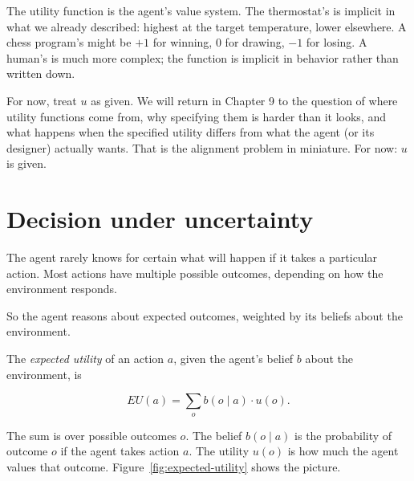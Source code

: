 The utility function is the agent's value system. The thermostat's is implicit in what we already described: highest at the target temperature, lower elsewhere. A chess program's might be $+1$ for winning, $0$ for drawing, $-1$ for losing. A human's is much more complex; the function is implicit in behavior rather than written down.

For now, treat $u$ as given. We will return in Chapter 9 to the question of where utility functions come from, why specifying them is harder than it looks, and what happens when the specified utility differs from what the agent (or its designer) actually wants. That is the alignment problem in miniature. For now: $u$ is given.

\section*{Decision under uncertainty}

The agent rarely knows for certain what will happen if it takes a particular action. Most actions have multiple possible outcomes, depending on how the environment responds.

So the agent reasons about expected outcomes, weighted by its beliefs about the environment.

The \emph{expected utility} of an action $a$, given the agent's belief $b$ about the environment, is

$$EU(a) = \sum_{o} b(o \mid a) \cdot u(o).$$

The sum is over possible outcomes $o$. The belief $b(o \mid a)$ is the probability of outcome $o$ if the agent takes action $a$. The utility $u(o)$ is how much the agent values that outcome. Figure~\ref{fig:expected-utility} shows the picture.


